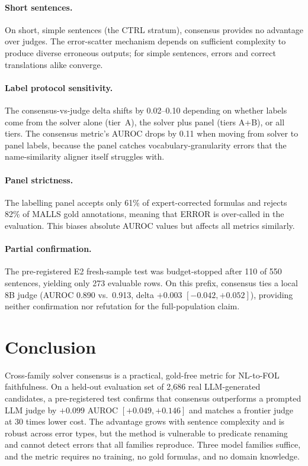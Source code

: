 \documentclass[11pt,letterpaper]{article}
\begin{document}
\paragraph{Short sentences.}
On short, simple sentences (the CTRL stratum), consensus provides no advantage over judges. The error-scatter mechanism depends on sufficient complexity to produce diverse erroneous outputs; for simple sentences, errors and correct translations alike converge.

\paragraph{Label protocol sensitivity.}
The consensus-vs-judge delta shifts by 0.02--0.10 depending on whether labels come from the solver alone (tier~A), the solver plus panel (tiers A+B), or all tiers. The consensus metric's AUROC drops by 0.11 when moving from solver to panel labels, because the panel catches vocabulary-granularity errors that the name-similarity aligner itself struggles with.

\paragraph{Panel strictness.}
The labelling panel accepts only 61\% of expert-corrected formulas and rejects 82\% of MALLS gold annotations, meaning that ERROR is over-called in the evaluation. This biases absolute AUROC values but affects all metrics similarly.

\paragraph{Partial confirmation.}
The pre-registered E2 fresh-sample test was budget-stopped after 110 of 550 sentences, yielding only 273 evaluable rows. On this prefix, consensus ties a local 8B judge (AUROC 0.890 vs.\ 0.913, delta $+0.003$ $[-0.042, +0.052]$), providing neither confirmation nor refutation for the full-population claim.


\section{Conclusion}
\label{sec:conclusion}

Cross-family solver consensus is a practical, gold-free metric for NL-to-FOL faithfulness. On a held-out evaluation set of 2,686 real LLM-generated candidates, a pre-registered test confirms that consensus outperforms a prompted LLM judge by $+0.099$ AUROC $[+0.049, +0.146]$ and matches a frontier judge at 30 times lower cost. The advantage grows with sentence complexity and is robust across error types, but the method is vulnerable to predicate renaming and cannot detect errors that all families reproduce. Three model families suffice, and the metric requires no training, no gold formulas, and no domain knowledge.



\end{document}
